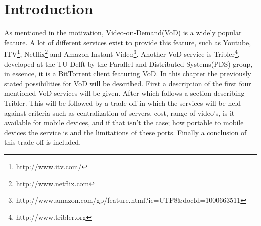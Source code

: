 \section{Introduction}
As mentioned in the motivation, Video-on-Demand(VoD) is a widely popular feature. A lot of different services exist to provide this feature, such as Youtube, ITV\footnote{http://www.itv.com/}, Netflix\footnote{http://www.netflix.com} and Amazon Instant Video\footnote{http://www.amazon.com/gp/feature.html?ie=UTF8\&docId=1000663511}. Another VoD service is Tribler\footnote{http://www.tribler.org}, developed at the TU Delft by the Parallel and Distributed Systems(PDS) group, in essence, it is a BitTorrent client featuring VoD. In this chapter the previously stated possibilities for VoD will be described. First a description of the first four mentioned VoD services will be given. After which follows a section describing Tribler. This will be followed by a trade-off in which the services will be held against criteria such as centralization of servers, cost, range of video's, is it available for mobile devices, and if that isn't the case; how portable to mobile devices the service is and the limitations of these ports. Finally a conclusion of this trade-off is included.